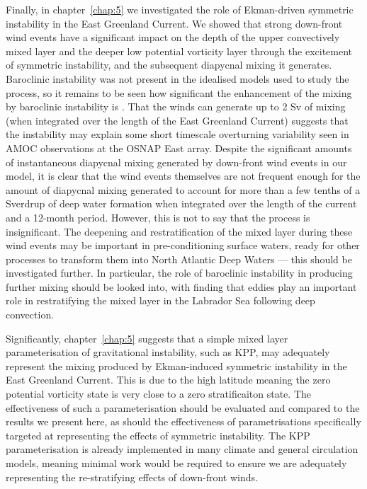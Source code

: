Finally, in chapter~\ref{chap:5} we investigated the role of Ekman-driven symmetric instability in the East Greenland Current. We showed that strong down-front wind events have a significant impact on the depth of the upper convectively mixed layer and the deeper low potential vorticity layer through the excitement of symmetric instability, and the subsequent diapycnal mixing it generates. Baroclinic instability was not present in the idealised models used to study the process, so it remains to be seen how significant the enhancement of the mixing by baroclinic instability is \citep{Spall2016}. That the winds can generate up to 2 Sv of mixing (when integrated over the length of the East Greenland Current) suggests that the instability may explain some short timescale overturning variability seen in AMOC observations at the OSNAP East array. Despite the significant amounts of instantaneous diapycnal mixing generated by down-front wind events in our model, it is clear that the wind events themselves are not frequent enough for the amount of diapycnal mixing generated to account for more than a few tenths of a Sverdrup of deep water formation when integrated over the length of the current and a 12-month period. However, this is not to say that the process is insignificant. The deepening and restratification of the mixed layer during these wind events may be important in pre-conditioning surface waters, ready for other processes to transform them into North Atlantic Deep Waters --- this should be investigated further. In particular, the role of baroclinic instability in producing further mixing should be looked into, with \citet{Gelderloos2011} finding that eddies play an important role in restratifying the mixed layer in the Labrador Sea following deep convection.

Significantly, chapter~\ref{chap:5} suggests that a simple mixed layer parameterisation of gravitational instability, such as KPP, may adequately represent the mixing produced by Ekman-induced symmetric instability in the East Greenland Current.
This is due to the high latitude meaning the zero potential vorticity state is very close to a zero stratificaiton state. The effectiveness of such a parameterisation should be evaluated and compared to the results we present here, as should the effectiveness of parametrisations specifically targeted at representing the effects of symmetric instability.
The KPP parameterisation is already implemented in many climate and general circulation models, meaning minimal work would be required to ensure we are adequately representing the re-stratifying effects of down-front winds.

